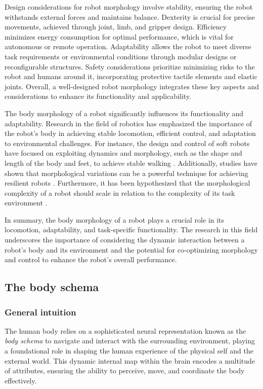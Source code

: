 Design considerations for robot morphology involve stability, ensuring the robot withstands external forces and maintains balance. Dexterity is crucial for precise movements, achieved through joint, limb, and gripper design. Efficiency minimizes energy consumption for optimal performance, which is vital for autonomous or remote operation. Adaptability allows the robot to meet diverse task requirements or environmental conditions through modular designs or reconfigurable structures. Safety considerations prioritize minimizing risks to the robot and humans around it, incorporating protective tactile elements and elastic joints. Overall, a well-designed robot morphology integrates these key aspects and considerations to enhance its functionality and applicability.

The body morphology of a robot significantly influences its functionality and adaptability. Research in the field of robotics has emphasized the importance of the robot's body in achieving stable locomotion, efficient control, and adaptation to environmental challenges. For instance, the design and control of soft robots have focused on exploiting dynamics and morphology, such as the shape and length of the body and feet, to achieve stable walking \cite{Pfeifer2007SelfOrganizationEmbodiment}. Additionally, studies have shown that morphological variations can be a powerful technique for achieving resilient robots \cite{Pagliuca2020dynamicbodybrain}. Furthermore, it has been hypothesized that the morphological complexity of a robot should scale in relation to the complexity of its task environment \cite{Auerbach2012RelationshipEnvironmentalMechanical}.

In summary, the body morphology of a robot plays a crucial role in its locomotion, adaptability, and task-specific functionality. The research in this field underscores the importance of considering the dynamic interaction between a robot's body and its environment and the potential for co-optimizing morphology and control to enhance the robot's overall performance.

\subsection{The body schema}

\subsubsection{General intuition}
The human body relies on a sophisticated neural representation known as the \textit{body schema} to navigate and interact with the surrounding environment, playing a foundational role in shaping the human experience of the physical self and the external world. This dynamic internal map within the brain encodes a multitude of attributes, ensuring the ability to perceive, move, and coordinate the body effectively.

